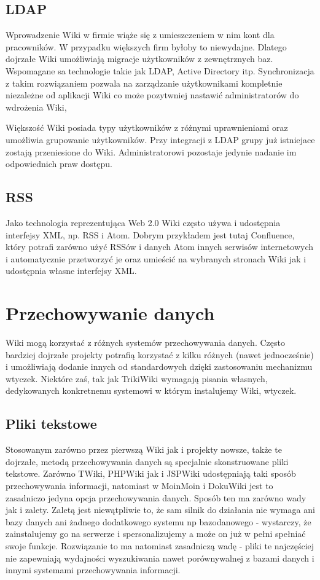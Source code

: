 \documentclass{article}
\begin{document}
\subsection{LDAP}

Wprowadzenie Wiki w firmie wiąże się z umieszczeniem w nim kont dla pracowników. W przypadku większych firm byłoby to niewydajne. Dlatego dojrzałe Wiki umożliwiają migracje użytkowników z zewnętrznych baz. Wspomagane sa technologie takie jak LDAP, Active Directory itp. Synchronizacja z takim rozwiązaniem pozwala na zarządzanie użytkownikami kompletnie niezależne od aplikacji Wiki co może pozytwniej nastawić administratorów do wdrożenia Wiki,  

Większość Wiki posiada typy użytkowników z różnymi uprawnieniami oraz umożliwia grupowanie użytkowników. Przy integracji z LDAP grupy już istniejace zostają przeniesione do Wiki. Administratorowi pozostaje jedynie nadanie im odpowiednich praw dostępu.

	\subsection{RSS}
	Jako technologia reprezentująca Web 2.0 Wiki często używa i udostępnia interfejsy XML, np. RSS i Atom. Dobrym przykładem jest tutaj Confluence, który potrafi zarówno użyć RSSów i danych Atom innych serwisów internetowych i automatycznie przetworzyć je oraz umieścić na wybranych stronach Wiki jak i udostępnia własne interfejsy XML.  
\newpage
\section{Przechowywanie danych}
	Wiki mogą korzystać z różnych systemów przechowywania danych. Często bardziej dojrzałe projekty potrafią korzystać z kilku różnych (nawet jednocześnie) i umożliwiają dodanie innych od standardowych dzięki zastosowaniu mechanizmu wtyczek. Niektóre zaś, tak jak TrikiWiki wymagają pisania własnych, dedykowanych konkretnemu systemowi w którym instalujemy Wiki, wtyczek. 
	\subsection{Pliki tekstowe}
	Stosowanym zarówno przez pierwszą Wiki jak i projekty nowsze, także te dojrzałe, metodą przechowywania danych są specjalnie skonstruowane pliki tekstowe. Zarówno TWiki, PHPWiki jak i JSPWiki udostępniają taki sposób przechowywania informacji, natomiast w MoinMoin i DokuWiki jest to zasadniczo jedyna opcja przechowywania danych. Sposób ten ma zarówno wady jak i zalety. Zaletą jest niewątpliwie to, że sam silnik do działania nie wymaga ani bazy danych ani żadnego dodatkowego systemu np bazodanowego - wystarczy, że zainstalujemy go na serwerze i spersonalizujemy a może on już w pełni spełniać swoje funkcje. Rozwiązanie to ma natomiast zasadniczą wadę - pliki te najczęściej nie zapewniają wydajności wyszukiwania nawet porównywalnej z bazami danych i innymi systemami przechowywania informacji. 
\end{document}
